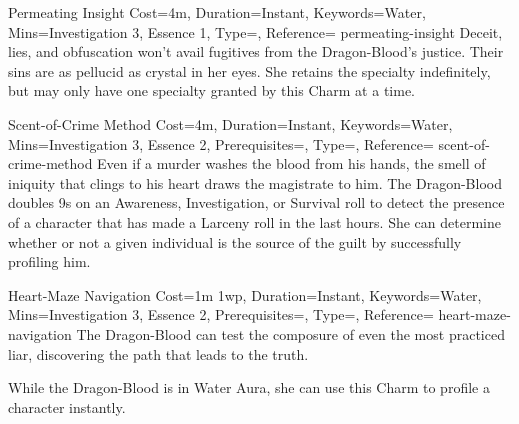 
\begin{Charm}{Permeating Insight}{%
    Cost=4m,
    Duration=Instant,
    Keywords=Water,
    Mins={Investigation 3, Essence 1},
    Type=\SupplementalType,
    Reference=\cite*[p.~198]{db}
}{permeating-insight}
    Deceit, lies, and obfuscation won't avail fugitives from the Dragon-Blood's
    justice. Their sins are as pellucid as crystal in her eyes.  She retains the specialty
    indefinitely, but may only have one specialty granted by this Charm at a time.
\end{Charm}


\begin{Charm}{Scent-of-Crime Method}{%
    Cost=4m,
    Duration=Instant,
    Keywords=Water,
    Mins={Investigation 3, Essence 2},
    Prerequisites=,
    Type=\SupplementalType,
    Reference=\cite*[p.~198]{db}
}{scent-of-crime-method}
    Even if a murder washes the blood from his hands, the smell of iniquity that
    clings to his heart draws the magistrate to him. The Dragon-Blood doubles 9s on
    an Awareness, Investigation, or Survival roll to detect the presence of a
    character that has made a Larceny roll in the last  hours.
    She can determine whether or not a given individual is the source of the guilt
    by successfully profiling him.
\end{Charm}


\begin{Charm}{Heart-Maze Navigation}{%
    Cost=1m 1wp,
    Duration=Instant,
    Keywords=Water,
    Mins={Investigation 3, Essence 2},
    Prerequisites=,
    Type=\SupplementalType,
    Reference=\cite*[p.~198]{db}
}{heart-maze-navigation}
    The Dragon-Blood can test the composure of even the most practiced liar,
    discovering the path that leads to the truth. 

    While the Dragon-Blood is in Water Aura, she can use this Charm to profile a
    character instantly.
\end{Charm}


